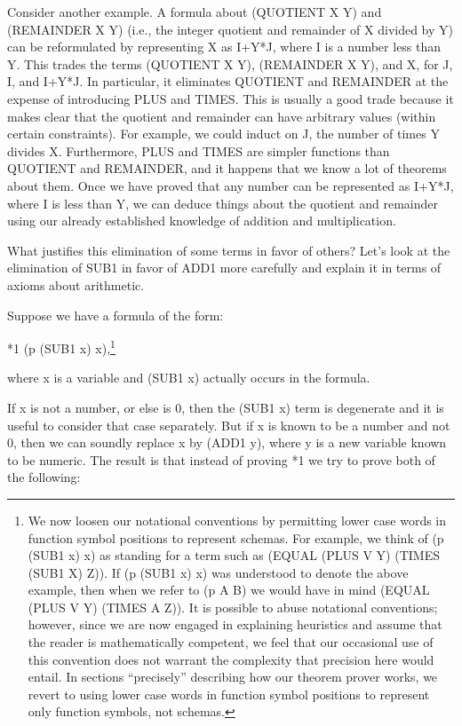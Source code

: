 \documentclass[10pt]{book}
\newenvironment{pubasis}{\begin{flushleft}}{\end{flushleft}}
\begin{document}
Consider another example.  A formula about (QUOTIENT X Y) and (REMAINDER X Y)
(i.e., the integer quotient and remainder of X divided
by Y) can be reformulated by representing X as I+Y*J, where I is a number less
than Y.  This trades the terms (QUOTIENT X Y), (REMAINDER X Y), and X, for
J, I, and I+Y*J.  In particular, it eliminates QUOTIENT and REMAINDER
at the expense of introducing PLUS and TIMES.  This is usually a
good trade because it makes clear that the quotient and remainder can
have arbitrary values (within certain constraints).  For example, we
could induct on J, the number of times Y divides X.  Furthermore,
PLUS and TIMES are simpler functions than QUOTIENT and REMAINDER, and it happens
that we know a lot of theorems about them.  Once we have proved that
any number can be represented as I+Y*J, where I is less than Y, we
can deduce things about the quotient and remainder using our
already established knowledge of addition and multiplication.

What justifies this elimination of some terms in favor of others?
Let's look at the elimination of SUB1 in favor of ADD1 more
carefully and explain it in terms of axioms about arithmetic.

Suppose we have a formula of the form:
\begin{pubasis}
*1	(p (SUB1 x) x),\footnote{We now loosen our notational conventions by permitting lower case words in function symbol positions to represent schemas.  For example, we think of (p (SUB1 x) x) as standing for a term such as (EQUAL (PLUS V Y) (TIMES (SUB1 X) Z)).  If (p (SUB1 x) x) was understood to denote the above example, then when we refer to (p A B) we would have in mind (EQUAL (PLUS V Y) (TIMES A Z)). It is possible to  abuse notational conventions; however, since we are now engaged in explaining heuristics and assume that the reader is mathematically competent, we feel that our occasional use of this convention does not warrant the complexity that precision here would entail.  In sections ``precisely'' describing how our theorem prover works, we revert to using lower case words in function symbol positions to represent only function symbols, not schemas.}\\
\end{pubasis}
where x is a variable and (SUB1 x) actually occurs in the formula.

If x is not a number, or else is 0, then the (SUB1 x) term is
degenerate and it is useful to consider that case separately.
But if x is known to be a number and not 0, then we can soundly
replace x by (ADD1 y), where y is a new variable known to be numeric.
The result is that instead of proving *1 we try to prove
both of the following:
\end{document}
